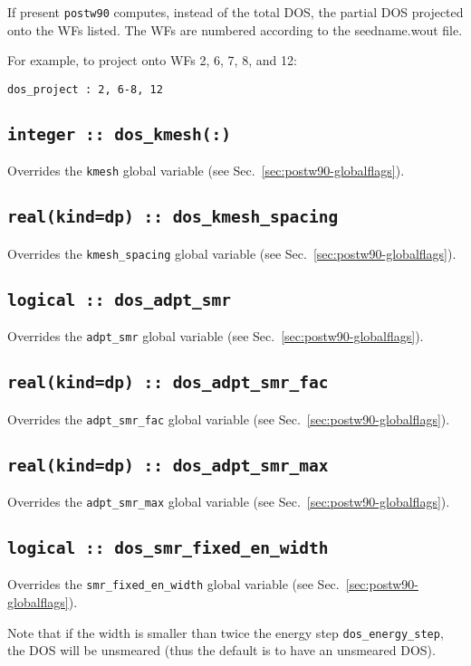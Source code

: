 If present {\tt postw90} computes, instead of the total DOS, the
partial DOS projected onto the WFs listed. The WFs are numbered
according to the seedname.wout file.

For example, to project onto WFs 2, 6, 7, 8, and 12:

{\tt dos\_project : 2, 6-8, 12}


\subsection[dos\_kmesh]{\tt integer :: dos\_kmesh(:)}
Overrides the \verb#kmesh# global variable (see Sec.~\ref{sec:postw90-globalflags}).

\subsection[dos\_kmesh\_spacing]{\tt real(kind=dp) :: dos\_kmesh\_spacing}
Overrides the \verb#kmesh_spacing# global variable (see Sec.~\ref{sec:postw90-globalflags}).

\subsection[dos\_adpt\_smr]{\tt logical :: dos\_adpt\_smr}
Overrides the \verb#adpt_smr# global variable (see Sec.~\ref{sec:postw90-globalflags}).

\subsection[dos\_adpt\_smr\_fac]{\tt real(kind=dp) :: dos\_adpt\_smr\_fac}
Overrides the \verb#adpt_smr_fac# global variable (see
Sec.~\ref{sec:postw90-globalflags}).

\subsection[dos\_adpt\_smr\_max]{\tt real(kind=dp) ::
  dos\_adpt\_smr\_max}
Overrides the \verb#adpt_smr_max# global variable (see
Sec.~\ref{sec:postw90-globalflags}).

\subsection[dos\_smr\_fixed\_en\_width]{\tt logical :: dos\_smr\_fixed\_en\_width}
Overrides the \verb#smr_fixed_en_width# global variable (see
Sec.~\ref{sec:postw90-globalflags}).

Note that if the width is smaller than twice the energy step {\tt dos\_energy\_step}, the DOS
will be unsmeared (thus the default is to have an unsmeared DOS).


